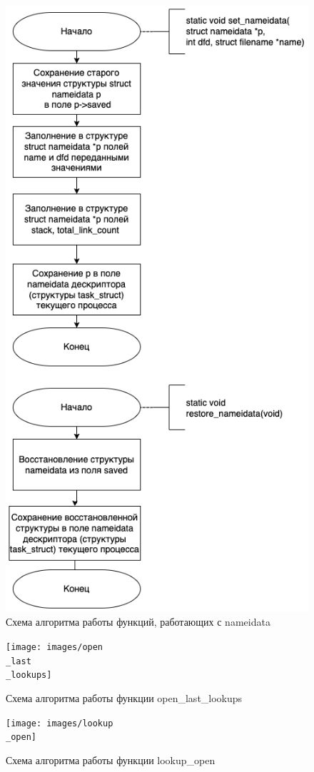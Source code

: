 \begin{figure}[h!]
	\begin{center}
		\includegraphics[width=120mm]{images/nameidata}
	\end{center}
	\caption{Схема алгоритма работы функций, работающих с nameidata}
	\label{img:name}
\end{figure}


\begin{figure}[h!]
	\begin{center}
		\texttt{[image: images/open\\\_last\\\_lookups]}
	\end{center}
	\caption{Схема алгоритма работы функции open\_last\_lookups}
	\label{img:look}
\end{figure}

\begin{figure}[h!]
	\begin{center}
		\texttt{[image: images/lookup\\\_open]}
	\end{center}
	\caption{Схема алгоритма работы функции lookup\_open}
	\label{img:lookup}
\end{figure}


